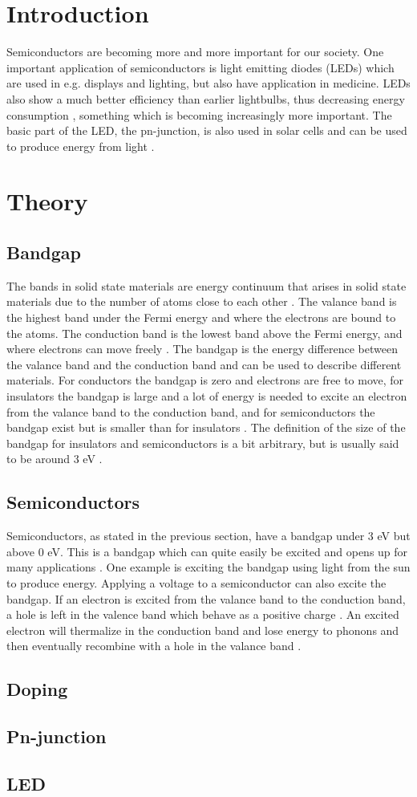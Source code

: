 \section{Introduction}
Semiconductors are becoming more and more important for our society. One important application of semiconductors is light emitting diodes (LEDs) \cite{hofmann2015} which are used in e.g. displays and lighting, but also have application in medicine. LEDs also show a much better efficiency than earlier lightbulbs, thus decreasing energy consumption \cite{hofmann2015}, something which is becoming increasingly more important. The basic part of the LED, the pn-junction, is also used in solar cells and can be used to produce energy from light \cite{hofmann2015}.

\section{Theory}
\subsection{Bandgap}
The bands in solid state materials are energy continuum that arises in solid state materials due to the number of atoms close to each other \cite{hofmann2015}. The valance band is the highest band under the Fermi energy and where the electrons are bound to the atoms. The conduction band is the lowest band above the Fermi energy, and where electrons can move freely \cite{hofmann2015}. The bandgap is the energy difference between the valance band and the conduction band and can be used to describe different materials. For conductors the bandgap is zero and electrons are free to move, for insulators the bandgap is large and a lot of energy is needed to excite an electron from the valance band to the conduction band, and for semiconductors the bandgap exist but is smaller than for insulators \cite{hofmann2015}. The definition of the size of the bandgap for insulators and semiconductors is a bit arbitrary, but is usually said to be around 3 eV \cite{hofmann2015}.

\subsection{Semiconductors}
Semiconductors, as stated in the previous section, have a bandgap under 3 eV but above 0 eV. This is a bandgap which can quite easily be excited and opens up for many applications \cite{hofmann2015}. One example is exciting the bandgap using light from the sun to produce energy. Applying a voltage to a semiconductor can also excite the bandgap. If an electron is excited from the valance band to the conduction band, a hole is left in the valence band which behave as a positive charge \cite{hofmann2015}. An excited electron will thermalize in the conduction band and lose energy to phonons and then eventually recombine with a hole in the valance band \cite{hofmann2015}.


\subsection{Doping}

\subsection{Pn-junction}

\subsection{LED}